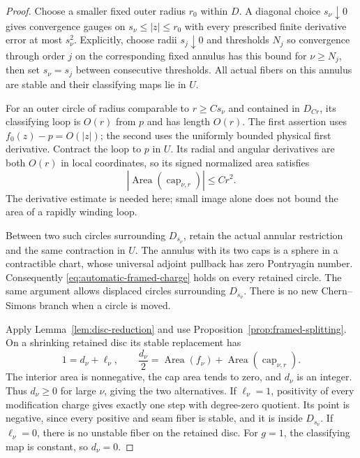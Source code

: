 \documentclass[11pt]{amsart}
\theoremstyle{definition}
\theoremstyle{remark}
\theoremstyle{plain}
\begin{document}
\begin{proof}
Choose a smaller fixed outer radius $r_0$ within $D$.
A diagonal choice $s_\nu\downarrow0$ gives convergence
gauges on $s_\nu\leq |z|\leq r_0$ with every prescribed
finite derivative error at most $s_\nu^2$. Explicitly,
choose radii $s_j\downarrow0$ and thresholds $N_j$
so convergence through order $j$ on the corresponding
fixed annulus has this bound for $\nu\geq N_j$,
then set $s_\nu=s_j$ between consecutive thresholds.
All actual fibers on this annulus are stable and their
classifying maps lie in $U$.

For an outer circle of radius comparable to $r\geq Cs_\nu$
and contained in $D_{Cr}$, its classifying loop is
$O(r)$ from $p$ and has length $O(r)$. The first assertion
uses $f_0(z)-p=O(|z|)$; the second uses the uniformly
bounded physical first derivative. Contract the loop to
$p$ in $U$. Its radial and angular derivatives are both
$O(r)$ in local coordinates, so its signed normalized
area satisfies
\begin{equation}\label{eq:automatic-small-cap}
             |\operatorname{Area}(\operatorname{cap}_{\nu,r})|
                                                       \leq Cr^2.
\end{equation}
The derivative estimate is needed here; small image alone
does not bound the area of a rapidly winding loop.

Between two such circles surrounding $D_{s_\nu}$, retain
the actual annular restriction and the same contraction
in $U$. The annulus with its two caps is a sphere in a
contractible chart, whose universal adjoint pullback has
zero Pontryagin number. Consequently
\eqref{eq:automatic-framed-charge} holds on every retained
circle. The same argument allows displaced circles
surrounding $D_{s_\nu}$. There is no new Chern--Simons
branch when a circle is moved.

Apply Lemma~\ref{lem:disc-reduction} and use
Proposition~\ref{prop:framed-splitting}. On a shrinking
retained disc its stable replacement has
\[
 1=d_\nu+\ell_\nu,\qquad
 \frac{d_\nu}{2}
   =\operatorname{Area}(f_\nu)
             +\operatorname{Area}(\operatorname{cap}_{\nu,r}).
\]
The interior area is nonnegative, the cap area tends to
zero, and $d_\nu$ is an integer. Thus $d_\nu\geq0$
for large $\nu$, giving the two alternatives. If
$\ell_\nu=1$, positivity of every modification charge
gives exactly one step with degree-zero quotient.
Its point is negative, since every positive and seam
fiber is stable, and it is inside $D_{s_\nu}$.
If $\ell_\nu=0$, there is no unstable fiber on the
retained disc. For $g=1$, the classifying map is constant,
so $d_\nu=0$.


\end{proof}
\end{document}
